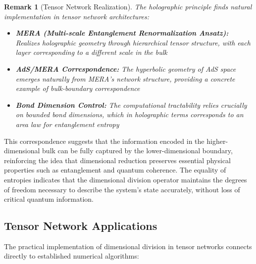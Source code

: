 \documentclass[sn-mathphys-num]{sn-jnl}
\theoremstyle{thmstyleone}
\theoremstyle{thmstyletwo}
\newtheorem{remark}{Remark}
\theoremstyle{thmstylethree}
\begin{document}
\begin{remark}[Tensor Network Realization]
The holographic principle finds natural implementation in tensor network architectures:
\begin{itemize}
    \item \textbf{MERA (Multi-scale Entanglement Renormalization Ansatz):} Realizes holographic geometry through hierarchical tensor structure, with each layer corresponding to a different scale in the bulk~\cite{vidal2008class}
    \item \textbf{AdS/MERA Correspondence:} The hyperbolic geometry of AdS space emerges naturally from MERA's network structure, providing a concrete example of bulk-boundary correspondence
    \item \textbf{Bond Dimension Control:} The computational tractability relies crucially on bounded bond dimensions, which in holographic terms corresponds to an area law for entanglement entropy
\end{itemize}
\end{remark}

This correspondence suggests that the information encoded in the higher-dimensional bulk can be fully captured by the lower-dimensional boundary, reinforcing the idea that dimensional reduction preserves essential physical properties such as entanglement and quantum coherence. The equality of entropies indicates that the dimensional division operator maintains the degrees of freedom necessary to describe the system's state accurately, without loss of critical quantum information.

\subsection{Tensor Network Applications}
The practical implementation of dimensional division in tensor networks connects directly to established numerical algorithms:
\end{document}
